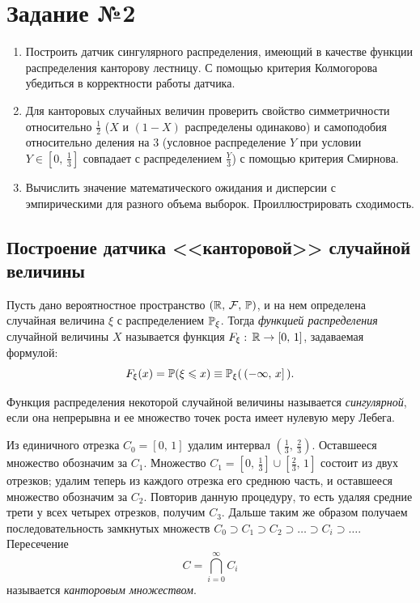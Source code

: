 \section{Задание №2}

\begin{enumerate}
        \item Построить датчик сингулярного распределения, имеющий в качестве функции распределения канторову лестницу. С помощью критерия Колмогорова убедиться в корректности работы датчика.
        \item Для канторовых случайных величин проверить свойство симметричности относительно $\frac12$ ($X$ и $(1 - X)$ распределены одинаково) и самоподобия относительно деления на $3$ (условное распределение $Y$ при условии $Y\in[0,\,\frac13]$ совпадает с распределением $\frac{Y}{3}$) с помощью критерия Смирнова.
        \item Вычислить значение математического ожидания и дисперсии с эмпирическими для разного объема выборок. Проиллюстрировать сходимость.
\end{enumerate}


\subsection{Построение датчика <<канторовой>> случайной величины}
\begin{definition}
        Пусть дано вероятностное пространство $(\mathbb{R},\, \mathcal{F},\,\mathbb{P})$, и на нем определена случайная величина $\xi$ с распределением $\mathbb{P}_\xi$. Тогда \textit{функцией распределения} случайной величины $X$ называется функция $F_\xi:\,\mathbb{R}\to[0,\,1]$, задаваемая формулой:
        $$
                F_\xi(x) = \mathbb{P}(\xi\leqslant x) \equiv \mathbb{P}_\xi(\,(-\infty,\,x]\,). 
        $$
\end{definition}

\begin{definition}
        Функция распределения некоторой случайной величины называется \textit{сингулярной}, если она непрерывна и ее множество точек роста имеет нулевую меру Лебега.
\end{definition}

\begin{definition}
        Из единичного отрезка $C_0 = [0,\,1]$ удалим интервал $\left(\frac13,\,\frac23\right)$. Оставшееся множество обозначим за $C_1$. Множество $C_1 = \left[0,\,\frac13\right]\cup\left[\frac23,\,1\right]$ состоит из двух отрезков; удалим теперь из каждого отрезка его среднюю часть, и оставшееся множество обозначим за $C_2$. Повторив данную процедуру, то есть удаляя средние трети у всех четырех отрезков, получим $C_3$. Дальше таким же образом получаем последовательность замкнутых множеств $C_0 \supset C_1 \supset C_2 \supset \ldots \supset C_i \supset \ldots$. Пересечение
        $$
                C = \bigcap_{i=0}^{\infty} C_i
        $$
        называется \textit{канторовым множеством}.
\end{definition}


